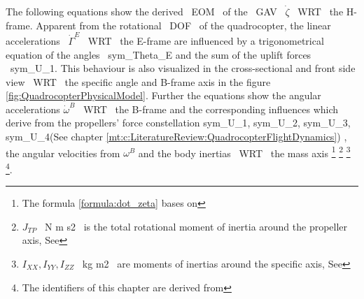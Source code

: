 \newpage
The following equations show the derived ~\gls{EOM}~ of the ~\gls{GAV}~
\ensuremath{\dot\zeta} ~\gls{WRT}~ the H-frame. Apparent from the rotational ~\gls{DOF}~
of the quadrocopter, the linear accelerations ~\ensuremath{\dot\Gamma^E} ~\gls{WRT}~
the E-frame are influenced by a trigonometrical equation of the angles
~\gls{sym_Theta_E} and the sum of the uplift forces
~\gls{sym_U_1}. This behaviour is also visualized in the
cross-sectional and front side view ~\gls{WRT}~ the specific angle and B-frame axis
in the figure \ref{fig:QuadrocopterPhysicalModel}. Further the equations show
the angular accelerations \ensuremath{\dot\omega^B}~ \gls{WRT}~ the B-frame and the
corresponding influences which derive from the propellers' force constellation
\gls{sym_U_1}, \gls{sym_U_2}, \gls{sym_U_3}, \gls{sym_U_4}(See chapter \ref{mt:c:LiteratureReview:QuadrocopterFlightDynamics})
, the angular velocities from
\ensuremath{\omega^B} and the body inertias ~\gls{WRT}~ the mass axis 
\footnote{The formula \ref{formula:dot_zeta} bases on }
\footnote{\ensuremath{J_{TP}}~ \lbrack N m s2\rbrack~ is the total rotational moment of inertia around the propeller axis, 
See }
\footnote{\ensuremath{I_{XX}, I_{YY}, I_{ZZ}}~ \lbrack kg m2\rbrack~ are moments
of inertias around the specific axis, 
See }
\footnote{The identifiers of this chapter are derived from }.



